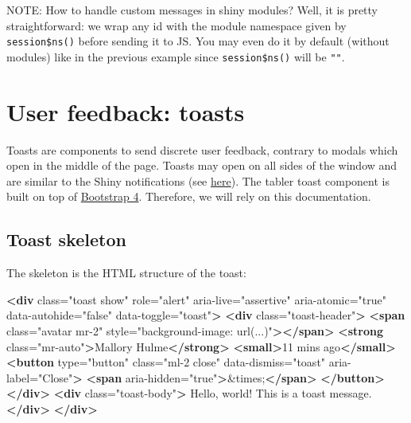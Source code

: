 \documentclass[]{book}
\newenvironment{Shaded}{\begin{snugshade}}{\end{snugshade}}
\newcommand{\DecValTok}[1]{\textcolor[rgb]{0.00,0.00,0.81}{#1}}
\newcommand{\KeywordTok}[1]{\textcolor[rgb]{0.13,0.29,0.53}{\textbf{#1}}}
\newcommand{\NormalTok}[1]{#1}
\newcommand{\OtherTok}[1]{\textcolor[rgb]{0.56,0.35,0.01}{#1}}
\newcommand{\StringTok}[1]{\textcolor[rgb]{0.31,0.60,0.02}{#1}}
\begin{document}
NOTE: How to handle custom messages in shiny modules? Well, it is pretty straightforward: we wrap any id with the module namespace given by \texttt{session\$ns()} before sending it to JS. You may even do it by default (without modules) like in the previous example since \texttt{session\$ns()} will be \texttt{""}.

\hypertarget{user-feedback-toasts}{%
\section{User feedback: toasts}\label{user-feedback-toasts}}

Toasts are components to send discrete user feedback, contrary to modals which open in the middle of the page. Toasts may open on all sides of the window and are similar to the Shiny notifications (see \href{https://shiny.rstudio.com/reference/shiny/0.14/showNotification.html}{here}). The tabler toast component is built on top of \href{https://getbootstrap.com/docs/4.3/components/toasts/}{Bootstrap 4}. Therefore, we will rely on this documentation.

\hypertarget{toast-skeleton}{%
\subsection{Toast skeleton}\label{toast-skeleton}}

The skeleton is the HTML structure of the toast:

\begin{Shaded}
\begin{Highlighting}[]
\KeywordTok{<div}\OtherTok{ class=}\StringTok{"toast show"}\OtherTok{ role=}\StringTok{"alert"}\OtherTok{ aria-live=}\StringTok{"assertive"}\OtherTok{ aria-atomic=}\StringTok{"true"}\OtherTok{ data-autohide=}\StringTok{"false"}\OtherTok{ data-toggle=}\StringTok{"toast"}\KeywordTok{>}
\KeywordTok{<div}\OtherTok{ class=}\StringTok{"toast-header"}\KeywordTok{>}
\KeywordTok{<span}\OtherTok{ class=}\StringTok{"avatar mr-2"}\OtherTok{ style=}\StringTok{"background-image: url(...)"}\KeywordTok{></span>}
\KeywordTok{<strong}\OtherTok{ class=}\StringTok{"mr-auto"}\KeywordTok{>}\NormalTok{Mallory Hulme}\KeywordTok{</strong>}
\KeywordTok{<small>}\NormalTok{11 mins ago}\KeywordTok{</small>}
\KeywordTok{<button}\OtherTok{ type=}\StringTok{"button"}\OtherTok{ class=}\StringTok{"ml-2 close"}\OtherTok{ data-dismiss=}\StringTok{"toast"}\OtherTok{ aria-label=}\StringTok{"Close"}\KeywordTok{>}
\KeywordTok{<span}\OtherTok{ aria-hidden=}\StringTok{"true"}\KeywordTok{>}\DecValTok{&times;}\KeywordTok{</span>}
\KeywordTok{</button>}
\KeywordTok{</div>}
\KeywordTok{<div}\OtherTok{ class=}\StringTok{"toast-body"}\KeywordTok{>}
\NormalTok{Hello, world! This is a toast message.}
\KeywordTok{</div>}
\KeywordTok{</div>}
\end{Highlighting}
\end{Shaded}
\end{document}
